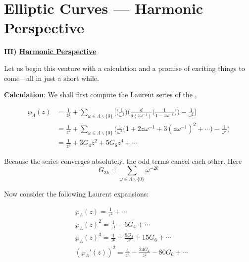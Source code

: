 \documentclass[11pt,a4paper]{article}
\begin{document}
\section*{Elliptic Curves — Harmonic Perspective}
\textbf{III) \underline{Harmonic Perspective}}

Let us begin this venture with a calculation and a promise of exciting things to come---all in just a short while.

\textbf{Calculation}: We shall first compute the Laurent series of the ,
\begin{center}
    \begin{equation*}
    \begin{aligned}
        \wp_{\Lambda}(z) &= \frac{1}{z^2} + \sum_{\omega \in \Lambda\backslash\{0\}}\bigg[\bigg(\frac{1}{\omega^2}\bigg)\bigg(\frac{d}{d(z\omega^{-1})}\bigg(\frac{1}{1-z\omega^{-1}}\bigg)\bigg) - \frac{1}{\omega^2}\bigg] \\
        &= \frac{1}{z^2} + \sum_{\omega \in \Lambda\backslash\{0\}}\bigg(\frac{1}{\omega^2}\bigg(1 + 2z\omega^{-1} + 3(z\omega^{-1})^2 +\cdots\bigg) - \frac{1}{\omega^2}\bigg)\\
        &= \frac{1}{z^2} + 3G_4z^2 + 5G_6z^4 + \cdots
    \end{aligned}
\end{equation*}
\end{center}

Because the series converges absolutely, the odd terms cancel each other. Here
$$G_{2k} = \sum_{\omega \in \Lambda\backslash\{0\}} \omega^{-2k}$$

Now consider the following Laurent expansions:

\begin{equation*}
    \begin{aligned}
        &\wp_{\Lambda}(z) = \frac{1}{z^2} + \cdots\\
        &\wp_{\Lambda}(z)^2 = \frac{1}{z^4} + 6G_4 + \cdots\\
        &\wp_{\Lambda}(z)^3 = \frac{1}{z^6} + \frac{9G_4}{z^2} + 15G_6 +\cdots\\
        &(\wp_{\Lambda}'(z))^2 = \frac{4}{z^6} - \frac{24G_4}{z^2} - 80G_6 + \cdots\\
    \end{aligned}
\end{equation*}
\end{document}
